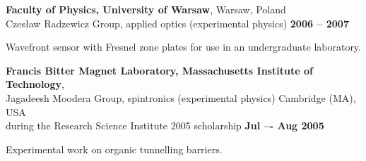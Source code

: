 \documentclass[margin,line]{resume}
\begin{document}
\begin{resume}
    {\bf Faculty of Physics, University of Warsaw}, Warsaw, Poland\\
    Czesław Radzewicz Group, applied optics (experimental physics) \hfill {\bf 2006 -- 2007}\\
    \begin{list2}
        \vspace*{-4mm}
        \item Wavefront sensor with Fresnel zone plates for use in an undergraduate laboratory.
    \end{list2}

    {\bf Francis Bitter Magnet Laboratory, Massachusetts Institute of Technology},\\
    Jagadeesh Moodera Group, spintronics (experimental physics) \hfill Cambridge (MA), USA\\
    during the Research Science Institute 2005 scholarship \hfill {\bf Jul –- Aug 2005}\\
    \begin{list2}
        \vspace*{-4mm}
        \item Experimental work on organic tunnelling barriers.
    \end{list2}

\vspace{3mm}
\newpage



    



\end{resume}
\end{document}
